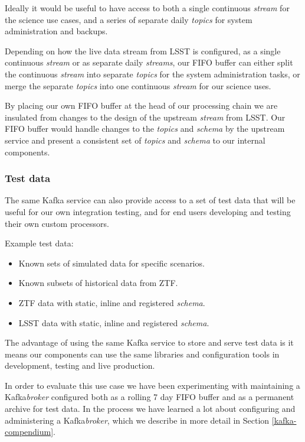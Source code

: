 \documentclass{article}
\newcommand{\kafka} {Kafka\xspace}
\newcommand{\kftopics} {\textit{topics}\xspace}
\newcommand{\kfstream} {\textit{stream}\xspace}
\newcommand{\kfstreams} {\textit{streams}\xspace}
\newcommand{\kfbroker} {\textit{broker}\xspace}
\newcommand{\fifo} {FIFO\xspace}
\newcommand{\avschema} {\textit{schema}\xspace}
\newcommand{\ztf} {ZTF\xspace}
\newcommand{\lsst} {LSST\xspace}
\begin{document}
Ideally it would be useful to have access to both a single continuous \kfstream for the science use cases, and a series of separate daily \kftopics for system administration and backups.

Depending on how the live data stream from \lsst is configured, as a single continuous \kfstream or as separate daily \kfstreams, our \fifo buffer can either split the continuous \kfstream into separate \kftopics for the system administration tasks, or merge the separate \kftopics into one continuous \kfstream for our science uses.

By placing our own \fifo buffer at the head of our processing chain we are insulated from changes to the design of the upstream \kfstream from \lsst.
Our \fifo buffer would handle changes to the \kftopics and \avschema by the upstream service and present a consistent set of \kftopics and \avschema to our internal components.

\subsubsection{Test data}
\label{stage-1.test-data}
The same \kafka service can also provide access to a set of test data that will be useful for our own integration testing, and for end users developing and testing their own custom processors.

Example test data:
\begin{itemize}
  \item Known sets of simulated data for specific scenarios.
  \item Known subsets of historical data from \ztf.
  \item \ztf data with static, inline and registered \avschema.
  \item \lsst data with static, inline and registered \avschema.
\end{itemize}

The advantage of using the same \kafka service to store and serve test data is it means our components can use the same libraries and configuration tools in development, testing and live production.

In order to evaluate this use case we have been experimenting with maintaining a \kafka \kfbroker configured both as a rolling 7 day \fifo buffer and as a permanent archive for test data.
In the process we have learned a lot about configuring and administering a \kafka \kfbroker, which we describe in more detail in Section \ref{kafka-compendium}.
\end{document}
